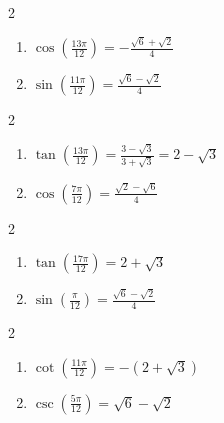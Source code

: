\documentclass{ximera}
\begin{document}
\begin{multicols}{2}

\begin{enumerate}

\setcounter{enumi}{\value{HW}}

\item  $\cos\left(\frac{13\pi}{12}\right) = -\frac{\sqrt{6}+\sqrt{2}}{4}$
\item  $\sin\left(\frac{11\pi}{12}\right) = \frac{\sqrt{6} - \sqrt{2}}{4}$

\setcounter{HW}{\value{enumi}}

\end{enumerate}

\end{multicols}

\begin{multicols}{2}

\begin{enumerate}

\setcounter{enumi}{\value{HW}}

\item  $\tan\left(\frac{13\pi}{12}\right) = \frac{3-\sqrt{3}}{3+\sqrt{3}} = 2-\sqrt{3}$
\item $\cos \left( \frac{7\pi}{12} \right) = \frac{\sqrt{2} - \sqrt{6}}{4}$

\setcounter{HW}{\value{enumi}}

\end{enumerate}

\end{multicols}

\begin{multicols}{2}

\begin{enumerate}

\setcounter{enumi}{\value{HW}}

\item $\tan \left( \frac{17\pi}{12} \right) = 2 + \sqrt{3}$
\item $\sin \left( \frac{\pi}{12} \right) = \frac{\sqrt{6} - \sqrt{2}}{4}$

\setcounter{HW}{\value{enumi}}

\end{enumerate}

\end{multicols}

\begin{multicols}{2}

\begin{enumerate}

\setcounter{enumi}{\value{HW}}

\item $\cot \left( \frac{11\pi}{12} \right) = -(2 + \sqrt{3})$
\item $\csc \left( \frac{5\pi}{12} \right) = \sqrt{6} - \sqrt{2}$

\setcounter{HW}{\value{enumi}}

\end{enumerate}

\end{multicols}
\end{document}
